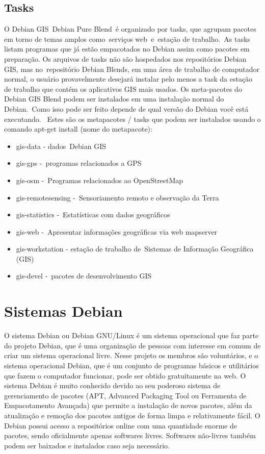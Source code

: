 \subsection{Tasks}
O Debian GIS Debian Pure Blend é organizado por tasks, que agrupam pacotes em torno de temas amplos como serviços web e estação de trabalho. As tasks listam programas que já estão empacotados no Debian assim como pacotes em preparação. Os arquivos de tasks não são hospedados nos repositórios Debian GIS, mas no repositório Debian Blends, em uma área de trabalho de computador normal, o usuário provavelmente desejará instalar pelo menos a task da estação de trabalho que contém os aplicativos GIS mais usados. 
Os meta-pacotes do Debian GIS Blend podem ser instalados em uma instalação normal do Debian. Como isso pode ser feito depende de qual versão do Debian você está executando.  
Estes são os metapacotes / tasks que podem ser instalados usando o comando apt-get install (nome do metapacote):
\begin{itemize}
	\item  gis-data - dados Debian GIS
	\item gis-gps - programas relacionados a GPS
	\item gis-osm - Programas relacionados ao OpenStreetMap
	\item gis-remotesensing - Sensoriamento remoto e observação da Terra
	\item gis-statistics - Estatísticas com dados geográficos
	\item gis-web - Apresentar informações geográficas via web mapserver
	\item gis-workstation - estação de trabalho de Sistemas de Informação Geográfica (GIS)
	\item gis-devel - pacotes de desenvolvimento GIS

\end{itemize}
\section{Sistemas Debian}
O sistema Debian ou Debian GNU/Linux é um sistema operacional que faz parte do projeto Debian, que é uma organização de pessoas com interesse em comum de criar um sistema operacional livre. Nesse projeto os membros são voluntários, e o sistema operacional Debian, que é um conjunto de programas básicos e utilitários que fazem o computador funcionar, pode ser obtido gratuitamente na web. O sistema Debian é muito conhecido devido ao seu poderoso sistema de gerenciamento de pacotes (APT, Advanced Packaging Tool ou Ferramenta de Empacotamento Avançada) que permite a instalação de novos pacotes, além da atualização e remoção dos pacotes antigos de forma limpa e relativamente fácil. O Debian possui acesso a repositórios online com uma quantidade enorme de pacotes, sendo oficialmente apenas softwares livres. Softwares não-livres também podem ser baixados e instalados caso seja necessário.

